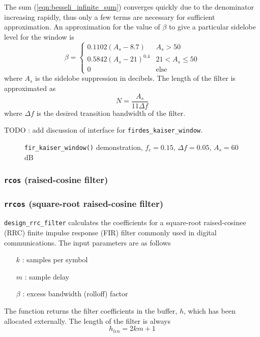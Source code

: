 The sum (\ref{eqn:besseli_infinite_sum}) converges quickly due to the
denominator increasing rapidly, thus only a few terms are necessary for
sufficient approximation.
An approximation for the value of $\beta$ to give a particular sidelobe level
for the window is
\begin{equation}
    \beta =
    \begin{cases}
        0.1102 (A_s - 8.7)      &   A_s > 50 \\
        0.5842 (A_s - 21)^{0.4} &   21 < A_s \le 50 \\
        0                       & \text{else}
    \end{cases}
\end{equation}
where $A_s$ is the sidelobe suppression in decibels.
The length of the filter is approximated as
\[
    N = \frac{A_s}{11 \Delta f}
\]
where $\Delta f$ is the desired transition bandwidth of the filter.

TODO : add discussion of interface for {\tt firdes\_kaiser\_window}.

\begin{figure}
\centering
{}
\caption{{\tt fir\_kaiser\_window()} demonstration, $f_c=0.15$,
$\Delta f=0.05$, $A_s=60$dB}
\label{fig:module:filter:firdes_kaiser}
\end{figure}


\subsubsection{{\tt rcos} (raised-cosine filter)}

\subsubsection{{\tt rrcos} (square-root raised-cosine filter)}
{\tt design\_rrc\_filter} calculates the coefficients for a square-root
raised-cosinee (RRC) finite impulse response (FIR) filter commonly used in
digital communications.
The input parameters are as follows
\begin{itemize}
    \item[$k$] : samples per symbol
    \item[$m$] : sample delay
    \item[$\beta$] : excess bandwidth (rolloff) factor
\end{itemize}
The function returns the filter coefficients in the buffer, $h$, which has been
allocated externally.  The length of the filter is always
\[
    h_{len} = 2 k m + 1
\]

